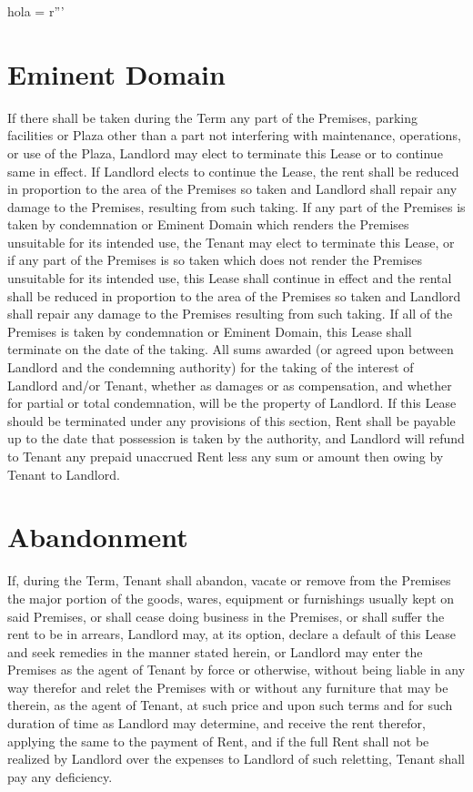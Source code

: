 hola = r'''\documentclass{article}
\begin{document}
\section{Eminent Domain}
    If there shall be taken during the Term any part of the Premises, parking facilities or Plaza other than a part not interfering with maintenance, operations, or use of the Plaza, Landlord may elect to terminate this Lease or to continue same in effect.  If Landlord elects to continue the Lease, the rent shall be reduced in proportion to the area of the Premises so taken and Landlord shall repair any damage to the Premises, resulting from such taking. If any part of the Premises is taken by condemnation or Eminent Domain which renders the Premises unsuitable for its intended use, the Tenant may elect to terminate this Lease, or if any part of the Premises is so taken which does not render the Premises unsuitable for its intended use, this Lease shall continue in effect and the rental shall be reduced in proportion to the area of the Premises so taken and Landlord shall repair any damage to the Premises resulting from such taking. If all of the Premises is taken by condemnation or Eminent Domain, this Lease shall terminate on the date of the taking. All sums awarded (or agreed upon between Landlord and the condemning authority) for the taking of the interest of Landlord and/or Tenant, whether as damages or as compensation, and whether for partial or total condemnation, will be the property of Landlord. If this Lease should be terminated under any provisions of this section, Rent shall be payable up to the date that possession is taken by the authority, and Landlord will refund to Tenant any prepaid unaccrued Rent less any sum or amount then owing by Tenant to Landlord.


\section{Abandonment}
    If, during the Term, Tenant shall abandon, vacate or remove from the Premises the major portion of the goods, wares, equipment or furnishings usually kept on said Premises, or shall cease doing business in the Premises, or shall suffer the rent to be in arrears, Landlord may, at its option, declare a default of this Lease and seek remedies in the manner stated herein, or Landlord may enter the Premises as the agent of Tenant by force or otherwise, without being liable in any way therefor and relet the Premises with or without any furniture that may be therein, as the agent of Tenant, at such price and upon such terms and for such duration of time as Landlord may determine, and receive the rent therefor, applying the same to the payment of Rent, and if the full Rent shall not be realized by Landlord over the expenses to Landlord of such reletting, Tenant shall pay any deficiency.
    
\end{document}
